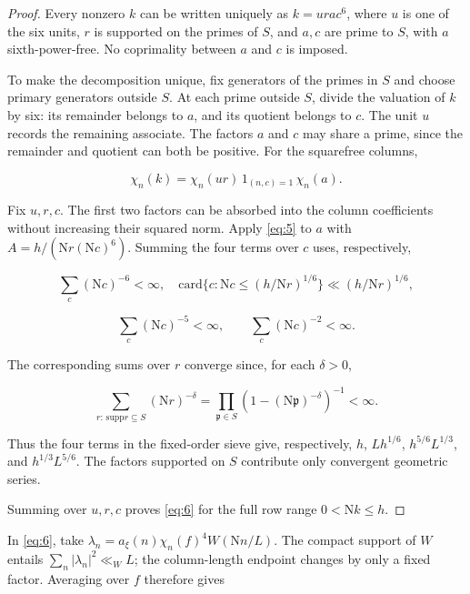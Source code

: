 \documentclass[reqno,a4paper,11pt]{amsart}
\begin{document}
\begin{proof}

Every nonzero $k$ can be written uniquely as $k=urac^6$, where $u$ is one of the six units, $r$ is supported on the primes of $S$, and $a,c$ are prime to $S$, with $a$ sixth-power-free. No coprimality between $a$ and $c$ is imposed.

To make the decomposition unique, fix generators of the primes in $S$ and choose primary generators outside $S$. At each prime outside $S$, divide the valuation of $k$ by six: its remainder belongs to $a$, and its quotient belongs to $c$. The unit $u$ records the remaining associate. The factors $a$ and $c$ may share a prime, since the remainder and quotient can both be positive. For the squarefree columns,

\[
{\chi }_{n}\left( k\right) ={\chi }_{n}\left( ur\right) \,{1}_{\left( n,c\right) =1}\,{\chi }_{n}\left( a\right) .
\]

Fix $u,r,c$. The first two factors can be absorbed into the column coefficients without increasing their squared norm. Apply \eqref{eq:5} to $a$ with $A=h/\left( \mathrm{N}r{\left( \mathrm{N}c\right) }^{6}\right) $. Summing the four terms over $c$ uses, respectively,

\[
\sum _{c} {\left( \mathrm{N}c\right) }^{-6}<\infty ,\quad \mathrm{card}\{c:\mathrm{N}c\le {\left( h/\mathrm{N}r\right) }^{1/6}\}\ll {\left( h/\mathrm{N}r\right) }^{1/6},
\]

\[
\sum _{c} {\left( \mathrm{N}c\right) }^{-5}<\infty ,\quad \quad \sum _{c} {\left( \mathrm{N}c\right) }^{-2}<\infty .
\]

The corresponding sums over $r$ converge since, for each $\delta >0$,

\[
\sum _{r:\,\mathrm{supp}r\subseteq S} {\left( \mathrm{N}r\right) }^{-\delta }=\prod _{\mathfrak{p}\in S} {\left( 1-{\left( \mathrm{N}\mathfrak{p}\right) }^{-\delta }\right) }^{-1}<\infty .
\]

Thus the four terms in the fixed-order sieve give, respectively, $h$, $Lh^{1/6}$, $h^{5/6}L^{1/3}$, and $h^{1/3}L^{5/6}$. The factors supported on $S$ contribute only convergent geometric series.

Summing over $u,r,c$ proves \eqref{eq:6} for the full row range $0<\mathrm{N}k\le h$.

\end{proof}

In \eqref{eq:6}, take ${\lambda }_{n}={a}_{\xi }\left( n\right) {\chi }_{n}{\left( f\right) }^{4}W\left( \mathrm{N}n/L\right) $. The compact support of $W$ entails $\sum _{n} {\left| {\lambda }_{n}\right| }^{2}{\ll }_{W}L$; the column-length endpoint changes by only a fixed factor. Averaging over $f$ therefore gives
\end{document}
